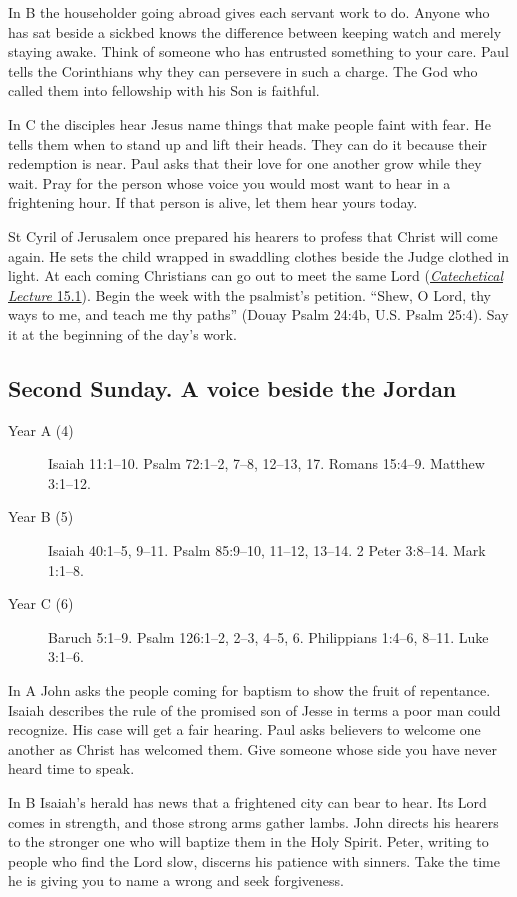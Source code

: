 In B the householder going abroad gives each servant work to do. Anyone
who has sat beside a sickbed knows the difference between keeping watch
and merely staying awake. Think of someone who has entrusted something
to your care. Paul tells the Corinthians why they can persevere in such
a charge. The God who called them into fellowship with his Son is faithful.

In C the disciples hear Jesus name things that make people faint with
fear. He tells them when to stand up and lift their heads. They can do
it because their redemption is near. Paul asks that their love for one
another grow while they wait. Pray for the person whose voice you would
most want to hear in a frightening hour. If that person is alive, let
them hear yours today.

St Cyril of Jerusalem once prepared his hearers to profess that Christ
will come again. He sets the child wrapped in swaddling clothes beside
the Judge clothed in light. At each coming Christians can go out to meet
the same Lord (\href{https://www.newadvent.org/fathers/310115.htm}{\emph{Catechetical Lecture} 15.1}).
Begin the week with the psalmist's petition. “Shew, O Lord, thy ways
to me, and teach me thy paths” (Douay Psalm 24:4b, U.S. Psalm 25:4).
Say it at the beginning of the day's work.

\subsection{Second Sunday. A voice beside the Jordan}

\begin{description}
\item[Year A (4)] Isaiah 11:1--10. Psalm 72:1--2, 7--8, 12--13, 17.
Romans 15:4--9. Matthew 3:1--12.
\item[Year B (5)] Isaiah 40:1--5, 9--11. Psalm 85:9--10, 11--12, 13--14.
2 Peter 3:8--14. Mark 1:1--8.
\item[Year C (6)] Baruch 5:1--9. Psalm 126:1--2, 2--3, 4--5, 6.
Philippians 1:4--6, 8--11. Luke 3:1--6.
\end{description}

In A John asks the people coming for baptism to show the fruit of
repentance. Isaiah describes the rule of the promised son of Jesse
in terms a poor man could recognize. His case will get a fair hearing.
Paul asks believers to welcome one another as Christ has welcomed
them. Give someone whose side you have never heard time to speak.

In B Isaiah's herald has news that a frightened city can bear to hear.
Its Lord comes in strength, and those strong arms gather lambs.
John directs his hearers to the stronger one who will baptize them in
the Holy Spirit. Peter, writing to people who find the Lord slow,
discerns his patience with sinners. Take the time he is giving you to
name a wrong and seek forgiveness.

